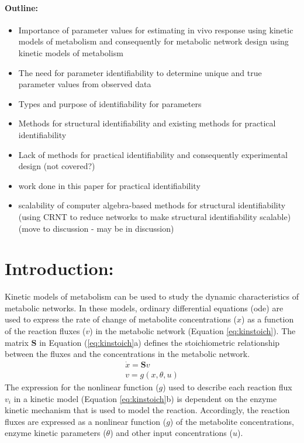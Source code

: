 \documentclass[10pt]{article}
\begin{document}
\paragraph{Outline:}
\begin{itemize}
	\item Importance of parameter values for estimating in vivo response using kinetic models of metabolism and consequently for metabolic network design using kinetic models of metabolism
	\item The need for parameter identifiability to determine unique and true parameter values from observed data
	\item Types and purpose of identifiability for parameters
	\item Methods for structural identifiability and existing methods for practical identifiability
	\item Lack of methods for practical identifiability and consequently experimental design (not covered?)
	\item work done in this paper for practical identifiability			
	\item scalability of computer algebra-based methods for structural identifiability (using CRNT to reduce networks to make structural identifiability scalable) (move to discussion - may be in discussion)
\end{itemize}	
\section{Introduction:}
Kinetic models of metabolism can be used to study the dynamic characteristics of metabolic networks. In these models, ordinary differential equations (ode) are used to express the rate of change of metabolite concentrations ($x$) as a function of the reaction fluxes ($v$) in the metabolic network (Equation \ref{eq:kinstoich}). The matrix $\mathbf{S}$ in Equation (\ref{eq:kinstoich}a) defines the stoichiometric relationship between the fluxes and the concentrations in the metabolic network.
\begin{subequations}\label{eq:kinstoich}
	\begin{align}
	\dot{x} = \mathbf{S}v\\
	v = g(x, \theta, u)
	\end{align}
\end{subequations}
The expression for the nonlinear function ($g$) used to describe each reaction flux $v_i$ in a kinetic model (Equation \ref{eq:kinstoich}b) is dependent on the enzyme kinetic mechanism that is used to model the reaction. Accordingly, the reaction fluxes are expressed as a nonlinear function ($g$) of the metabolite concentrations, enzyme kinetic parameters ($\theta$) and other input concentrations ($u$). 
\end{document}
